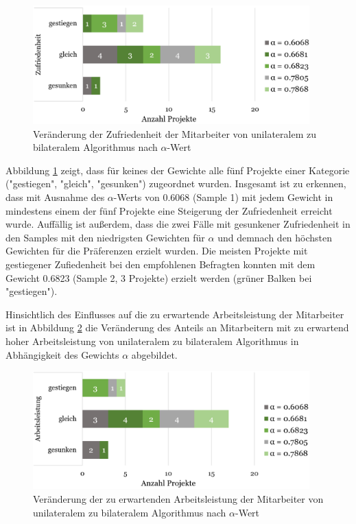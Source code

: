 \begin{figure}[H]
    \centering
	\includegraphics[width=0.95\textwidth]{gfx/verhaeltnis-z-nach-alpha-ges.png}
	\caption[Veränderung der Zufriedenheit der Mitarbeiter von unilateralem zu bilateralem Algorithmus nach $\alpha$-Wert]{Veränderung der Zufriedenheit der Mitarbeiter von unilateralem zu bilateralem Algorithmus nach $\alpha$-Wert}
	\label{fig:ergebnisse:abb12}
\end{figure}

Abbildung \ref{fig:ergebnisse:abb12} zeigt, dass für keines der Gewichte alle fünf Projekte einer Kategorie ("gestiegen", "gleich", "gesunken") zugeordnet wurden.
Insgesamt ist zu erkennen, dass mit Ausnahme des $\alpha$-Werts von 0.6068 (Sample 1) mit jedem Gewicht in mindestens einem der fünf Projekte eine Steigerung der Zufriedenheit erreicht wurde.
Auffällig ist außerdem, dass die zwei Fälle mit gesunkener Zufriedenheit in den Samples mit den niedrigsten Gewichten für $\alpha$ und demnach den höchsten Gewichten für die Präferenzen erzielt wurden.
Die meisten Projekte mit gestiegener Zufiedenheit bei den empfohlenen Befragten konnten mit dem Gewicht 0.6823 (Sample 2, 3 Projekte) erzielt werden (grüner Balken bei "gestiegen").

Hinsichtlich des Einflusses auf die zu erwartende Arbeitsleistung der Mitarbeiter ist in Abbildung \ref{fig:ergebnisse:abb13} die Veränderung des Anteils an Mitarbeitern mit zu erwartend hoher Arbeitsleistung von unilateralem zu bilateralem Algorithmus in Abhängigkeit des Gewichts $\alpha$ abgebildet.

\begin{figure}[H]
    \centering
	\includegraphics[width=0.95\textwidth]{gfx/verhaeltnis-a-nach-alpha-ges.png}
	\caption[Veränderung der zu erwartenden Arbeitsleistung der Mitarbeiter von unilateralem zu bilateralem Algorithmus nach $\alpha$-Wert]{Veränderung der zu erwartenden Arbeitsleistung der Mitarbeiter von unilateralem zu bilateralem Algorithmus nach $\alpha$-Wert}
	\label{fig:ergebnisse:abb13}
\end{figure}

